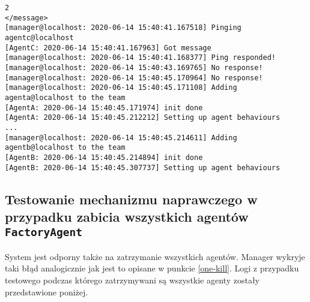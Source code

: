 \begin{lstlisting}
2
</message>
[manager@localhost: 2020-06-14 15:40:41.167518] Pinging agentc@localhost
[AgentC: 2020-06-14 15:40:41.167963] Got message
[manager@localhost: 2020-06-14 15:40:41.168377] Ping responded!
[manager@localhost: 2020-06-14 15:40:43.169765] No response!
[manager@localhost: 2020-06-14 15:40:45.170964] No response!
[manager@localhost: 2020-06-14 15:40:45.171108] Adding agenta@localhost to the team
[AgentA: 2020-06-14 15:40:45.171974] init done
[AgentA: 2020-06-14 15:40:45.212212] Setting up agent behaviours
...
[manager@localhost: 2020-06-14 15:40:45.214611] Adding agentb@localhost to the team
[AgentB: 2020-06-14 15:40:45.214894] init done
[AgentB: 2020-06-14 15:40:45.307737] Setting up agent behaviours
\end{lstlisting}
\subsection{Testowanie mechanizmu naprawczego w przypadku zabicia wszystkich agentów \texttt{FactoryAgent}}
System jest odporny także na zatrzymanie wszystkich agentów. Manager wykryje taki błąd analogicznie jak jest to opisane w punkcie \ref{one-kill}. Logi z przypadku testowego podczas którego zatrzymywani są wszystkie agenty zostały przedstawione poniżej.
